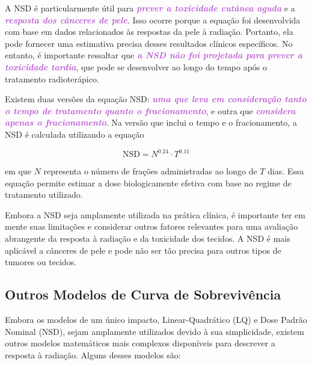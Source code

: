\documentclass[11pt,a4paper]{article}
\begin{document}
	A NSD é particularmente útil para \textcolor{MediumOrchid}{\textbf{\textit{prever a toxicidade cutânea aguda}}} e a \textcolor{MediumOrchid}{\textbf{\textit{resposta dos cânceres de pele}}}. Isso ocorre porque a equação foi desenvolvida com base em dados relacionados às respostas da pele à radiação. Portanto, ela pode fornecer uma estimativa precisa desses resultados clínicos específicos. No entanto, é importante ressaltar que \textcolor{MediumOrchid}{\textbf{\textit{a NSD não foi projetada para prever a toxicidade tardia}}}, que pode se desenvolver ao longo do tempo após o tratamento radioterápico.

	Existem duas versões da equação NSD:\textcolor{MediumOrchid}{\textbf{\textit{ uma que leva em consideração tanto o tempo de tratamento quanto o fracionamento}}}, e outra que \textcolor{MediumOrchid}{\textbf{\textit{considera apenas o fracionamento}}}. Na versão que inclui o tempo e o fracionamento, a NSD é calculada utilizando a equação

	\begin{equation}
		\text{NSD} = N^{0.24} \cdot T^{0.11}
	\end{equation}
	
	\noindent em que $N$ representa o número de frações administradas ao longo de $T$ dias. Essa equação permite estimar a dose biologicamente efetiva com base no regime de tratamento utilizado.

	Embora a NSD seja amplamente utilizada na prática clínica, é importante ter em mente suas limitações e considerar outros fatores relevantes para uma avaliação abrangente da resposta à radiação e da toxicidade dos tecidos. A NSD é mais aplicável a cânceres de pele e pode não ser tão precisa para outros tipos de tumores ou tecidos.

\subsection{Outros Modelos de Curva de Sobrevivência}

	Embora os modelos de um único impacto, Linear-Quadrático (LQ) e Dose Padrão Nominal (NSD), sejam amplamente utilizados devido à sua simplicidade, existem outros modelos matemáticos mais complexos disponíveis para descrever a resposta à radiação. Alguns desses modelos são:
\end{document}
